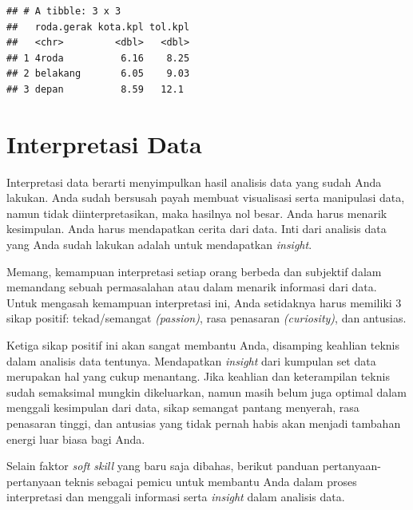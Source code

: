 \documentclass[openany]{book}
\begin{document}
\begin{verbatim}
## # A tibble: 3 x 3
##   roda.gerak kota.kpl tol.kpl
##   <chr>         <dbl>   <dbl>
## 1 4roda          6.16    8.25
## 2 belakang       6.05    9.03
## 3 depan          8.59   12.1
\end{verbatim}

\section{Interpretasi Data}\label{interpretasi-data}

Interpretasi data berarti menyimpulkan hasil analisis data yang sudah
Anda lakukan. Anda sudah bersusah payah membuat visualisasi serta
manipulasi data, namun tidak diinterpretasikan, maka hasilnya nol besar.
Anda harus menarik kesimpulan. Anda harus mendapatkan cerita dari data.
Inti dari analisis data yang Anda sudah lakukan adalah untuk mendapatkan
\emph{insight}.

Memang, kemampuan interpretasi setiap orang berbeda dan subjektif dalam
memandang sebuah permasalahan atau dalam menarik informasi dari data.
Untuk mengasah kemampuan interpretasi ini, Anda setidaknya harus
memiliki 3 sikap positif: tekad/semangat \emph{(passion)}, rasa
penasaran \emph{(curiosity)}, dan antusias.

Ketiga sikap positif ini akan sangat membantu Anda, disamping keahlian
teknis dalam analisis data tentunya. Mendapatkan \emph{insight} dari
kumpulan set data merupakan hal yang cukup menantang. Jika keahlian dan
keterampilan teknis sudah semaksimal mungkin dikeluarkan, namun masih
belum juga optimal dalam menggali kesimpulan dari data, sikap semangat
pantang menyerah, rasa penasaran tinggi, dan antusias yang tidak pernah
habis akan menjadi tambahan energi luar biasa bagi Anda.

Selain faktor \emph{soft skill} yang baru saja dibahas, berikut panduan
pertanyaan-pertanyaan teknis sebagai pemicu untuk membantu Anda dalam
proses interpretasi dan menggali informasi serta \emph{insight} dalam
analisis data.
\end{document}
